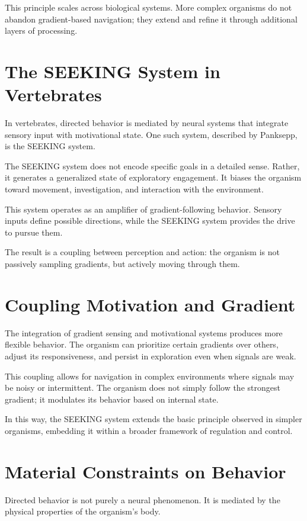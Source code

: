 \documentclass[11pt,oneside]{book}
\begin{document}
This principle scales across biological systems. More complex organisms do not abandon gradient-based navigation; they extend and refine it through additional layers of processing.

\section{The SEEKING System in Vertebrates}

In vertebrates, directed behavior is mediated by neural systems that integrate sensory input with motivational state. One such system, described by Panksepp, is the SEEKING system.

The SEEKING system does not encode specific goals in a detailed sense. Rather, it generates a generalized state of exploratory engagement. It biases the organism toward movement, investigation, and interaction with the environment.

This system operates as an amplifier of gradient-following behavior. Sensory inputs define possible directions, while the SEEKING system provides the drive to pursue them.

The result is a coupling between perception and action: the organism is not passively sampling gradients, but actively moving through them.

\section{Coupling Motivation and Gradient}

The integration of gradient sensing and motivational systems produces more flexible behavior. The organism can prioritize certain gradients over others, adjust its responsiveness, and persist in exploration even when signals are weak.

This coupling allows for navigation in complex environments where signals may be noisy or intermittent. The organism does not simply follow the strongest gradient; it modulates its behavior based on internal state.

In this way, the SEEKING system extends the basic principle observed in simpler organisms, embedding it within a broader framework of regulation and control.

\section{Material Constraints on Behavior}

Directed behavior is not purely a neural phenomenon. It is mediated by the physical properties of the organism’s body.
\end{document}
